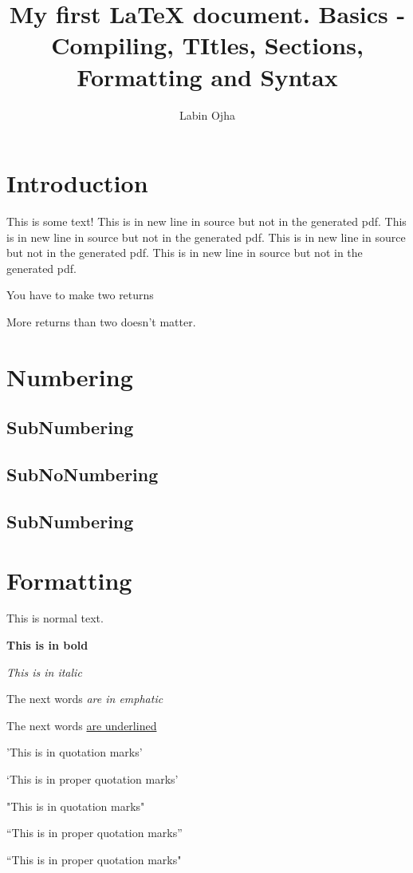 \documentclass{article}
\author{Labin Ojha}
\title{My first {\LaTeX} document. Basics - Compiling, TItles, Sections, Formatting and Syntax}
\begin{document}
\maketitle

\section{Introduction}

This is some text!
This is in new line in source but not in the generated pdf.
This is in new line in source but not in the generated pdf.
This is in new line in source but not in the generated pdf.
This is in new line in source but not in the generated pdf.

You have to make two returns




More returns than two doesn't matter.

\section{Numbering}

\subsection{SubNumbering}

\subsection*{SubNoNumbering}

\subsection{SubNumbering}

\section{Formatting}

This is normal text.

\textbf{This is in bold}

\textit{This is in italic}

The next words \emph{are in emphatic}

The next words \underline{are underlined}


'This is in quotation marks'

`This is in proper quotation marks'

"This is in quotation marks"

``This is in proper quotation marks''

``This is in proper quotation marks"
\end{document}
